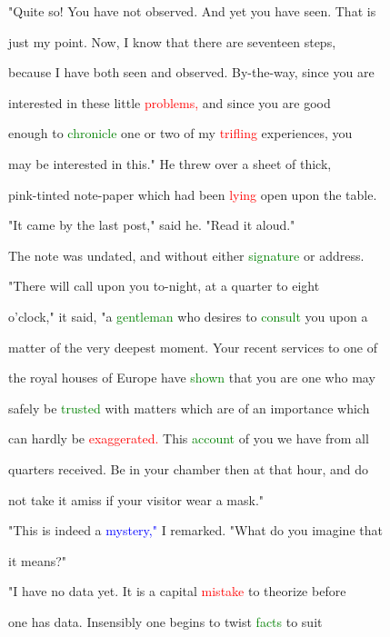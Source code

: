  "Quite so! You have not observed. And yet you have seen. That is

 just my point. Now, I know that there are seventeen steps,

 because I have both seen and observed. By-the-way, since you are

 \textcolor{BurntOrange}{interested} in these little \textcolor{red}{problems,} and since you are \textcolor{BurntOrange}{good}

 enough to \textcolor{green}{chronicle} one or two of my \textcolor{red}{trifling} experiences, you

 may be \textcolor{BurntOrange}{interested} in this." He threw over a sheet of thick,

 pink-tinted note-paper which had been \textcolor{red}{lying} open upon the table.

 "It came by the last post," said he. "Read it aloud."



 The note was undated, and without either \textcolor{green}{signature} or address.



 "There will call upon you to-night, at a quarter to eight

 o'clock," it said, "a \textcolor{green}{gentleman} who desires to \textcolor{green}{consult} you upon a

 matter of the very deepest moment. Your recent services to one of

 the royal houses of Europe have \textcolor{green}{shown} that you are one who may

 safely be \textcolor{green}{trusted} with matters which are of an \textcolor{BurntOrange}{importance} which

 can hardly be \textcolor{red}{exaggerated.} This \textcolor{green}{account} of you we have from all

 quarters received. Be in your chamber then at that hour, and do

 not take it amiss if your \textcolor{BurntOrange}{visitor} \textcolor{BurntOrange}{wear} a mask."



 "This is indeed a \textcolor{blue}{mystery,"} I remarked. "What do you imagine that

 it means?"



 "I have no data yet. It is a capital \textcolor{red}{mistake} to theorize before

 one has data. Insensibly one begins to twist \textcolor{green}{facts} to suit

